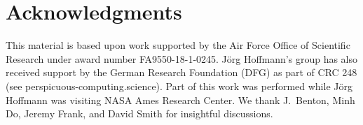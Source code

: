 \documentclass{article}
\begin{document}













%



%

\section*{Acknowledgments}

This material is based upon work supported by the Air Force Office
of Scientific Research under award number FA9550-18-1-0245. J\"org
Hoffmann's group has also received support by the German Research
Foundation (DFG) as part of CRC 248 (see
perspicuous-computing.science). Part of this work was performed
while J\"org Hoffmann was visiting NASA Ames Research Center. We
thank J.\ Benton, Minh Do, Jeremy Frank, and David Smith for
insightful discussions.

\ifdefined\longflagdefined




\else 




\fi





\ifdefined\suppflagdefined

\appendix



\fi
\end{document}
